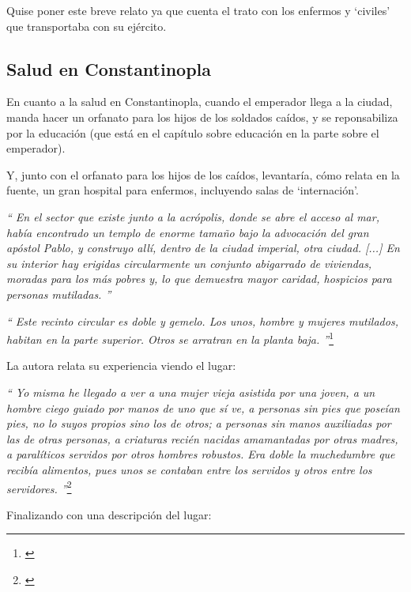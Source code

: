 Quise poner este breve relato ya que cuenta el trato con los enfermos
y `civiles' que transportaba con su ejército.

\subsection{Salud en Constantinopla}

En cuanto a la salud en Constantinopla, cuando el emperador llega
a la ciudad, manda hacer un orfanato para los hijos de los soldados
caídos, y se reponsabiliza por la educación (que está en el capítulo
sobre educación en la parte sobre el emperador).

Y, junto con el orfanato para los hijos de los caídos, levantaría,
cómo relata en la fuente, un gran hospital para enfermos, incluyendo
salas de `internación'.

\textit{``
	En el sector que existe junto a la acrópolis, donde se abre
	el acceso al mar, había encontrado un templo de enorme tamaño
	bajo la advocación del gran apóstol Pablo, y construyo allí,
	dentro de la ciudad imperial, otra ciudad. [...] En su interior
	hay erigidas circularmente un conjunto abigarrado de viviendas,
	moradas para los más pobres y, lo que demuestra mayor caridad,
	hospicios para personas mutiladas.
	''}

\textit{``
	Este recinto circular es doble y gemelo. Los unos, hombre y
	mujeres mutilados, habitan en la parte superior. Otros se arratran
	en la planta baja.
	''}\footnote{\cite[p.~606]{alexiadaXV}}

La autora relata su experiencia viendo el lugar:

\textit{``
	Yo misma he llegado a ver a una mujer vieja asistida por una
	joven, a un hombre ciego guiado por manos de uno que sí ve,
	a personas sin pies que poseían pies, no lo suyos propios
	sino los de otros; a personas sin manos auxiliadas por las de
	otras personas, a criaturas recién nacidas amamantadas por otras
	madres, a paralíticos servidos por otros hombres robustos.
	Era doble la muchedumbre que recibía alimentos, pues unos se
	contaban entre los servidos y otros entre los servidores.
	''}\footnote{\cite[p.~607]{alexiadaXV}}

Finalizando con una descripción del lugar:

